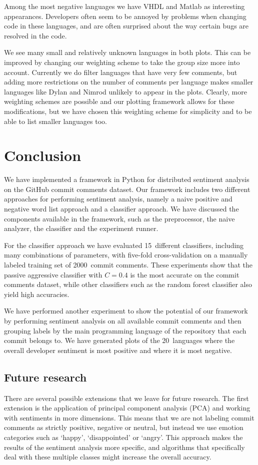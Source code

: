 \documentclass{article}
\begin{document}
Among the most negative languages we have VHDL and Matlab as interesting 
appearances. Developers often seem to be annoyed by problems when changing
code in these languages, and are often surprised about the way certain bugs 
are resolved in the code.

We see many small and relatively unknown languages in both plots. This can be
improved by changing our weighting scheme to take the group size more into
account. Currently we do filter languages that have very few comments, but
adding more restrictions on the number of comments per language makes smaller
languages like Dylan and Nimrod unlikely to appear in the plots. Clearly,
more weighting schemes are possible and our plotting framework allows for
these modifications, but we have chosen this weighting scheme for simplicity
and to be able to list smaller languages too.

\section{Conclusion}\label{sec:conclusion}
We have implemented a framework in Python for distributed sentiment analysis on
the GitHub commit comments dataset. Our framework includes two different
approaches for performing sentiment analysis, namely a naive positive and
negative word list approach and a classifier approach. We have discussed the
components available in the framework, such as the preprocessor, the naive
analyzer, the classifier and the experiment runner.

For the classifier approach we have evaluated 15~different classifiers,
including many combinations of parameters, with five-fold cross-validation on
a manually labeled training set of 2000~commit comments. These experiments show
that the passive aggressive classifier with $C = 0.4$ is the most accurate on 
the commit comments dataset, while other classifiers such as the random forest 
classifier also yield high accuracies.

We have performed another experiment to show the potential of our framework by
performing sentiment analysis on all available commit comments and then grouping
labels by the main programming language of the repository that each commit
belongs to. We have generated plots of the 20~languages where the overall
developer sentiment is most positive and where it is most negative.

\subsection{Future research}\label{sec:future-research}
There are several possible extensions that we leave for future research. The
first extension is the application of principal component analysis (PCA) and
working with sentiments in more dimensions. This means that we are not labeling
commit comments as strictly positive, negative or neutral, but instead we use
emotion categories such as `happy', `disappointed' or `angry'. This approach
makes the results of the sentiment analysis more specific, and algorithms that 
specifically deal with these multiple classes might increase the overall 
accuracy.
\end{document}

